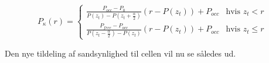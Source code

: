 \begin{equation}
	P_\kappa(r) = \begin{cases}
		\frac{P_{occ}-P_0}{P(z_t)-P(z_t+\frac{\alpha}{2})}(r-P(z_t))+P_{occ} &\text{hvis } z_t < r \\
		\frac{P_{free}-P_{occ}}{P(z_t-\frac{\alpha}{2})-P(z_t)}(r-P(z_t))+P_{occ} &\text{hvis } z_t \leq r 
	\end{cases}
\end{equation}








Den nye tildeling af sandsynlighed til cellen vil nu se således ud.



